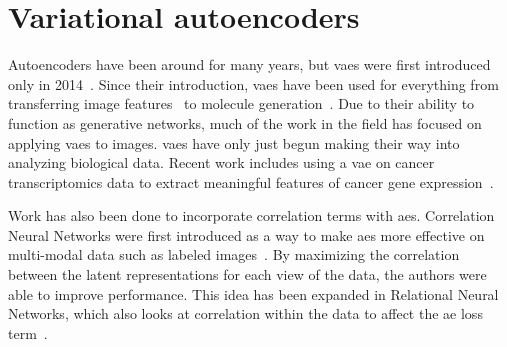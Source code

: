 
\section{Variational autoencoders}
Autoencoders have been around for many years, but \glspl{vae} were first introduced only in 2014~\cite{kingma2013auto, rezende2014stochastic}.
Since their introduction, \glspl{vae} have been used for everything from transferring image features~\cite{larsen2015autoencoding} to molecule generation~\cite{gomez2016automatic}.
Due to their ability to function as generative networks, much of the work in the field has focused on applying \glspl{vae} to images.
\glspl{vae} have only just begun making their way into analyzing biological data.
Recent work includes using a \gls{vae} on cancer transcriptomics data to extract meaningful features of cancer gene expression~\cite{way2017extracting}.

Work has also been done to incorporate correlation terms with \glspl{ae}.
Correlation Neural Networks were first introduced as a way to make \glspl{ae} more effective on multi-modal data such as labeled images~\cite{chandar2016correlational}.
By maximizing the correlation between the latent representations for each view of the data, the authors were able to improve performance.
This idea has been expanded in Relational Neural Networks, which also looks at correlation within the data to affect the \gls{ae} loss term~\cite{meng2017relational}.